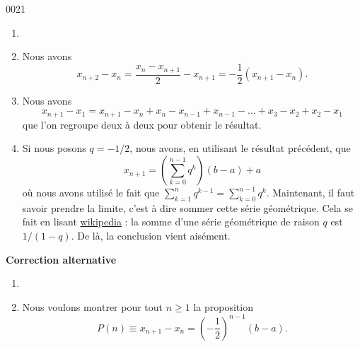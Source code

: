 
\begin{corrige}{0021}

\begin{enumerate}
\item {}
\item Nous avons
\begin{equation}
	x_{n+2}-x_n=\frac{ x_n-x_{n+1} }{ 2 }-x_{n+1}=-\frac{1}{ 2 }(x_{n+1}-x_n).
\end{equation}

\item 
Nous avons
\begin{equation}
	x_{n+1}-x_1=x_{n+1}-x_n+x_n-x_{n-1}+x_{n-1}-\ldots +x_3-x_2+x_2-x_1
\end{equation}
que l'on regroupe deux à deux pour obtenir le résultat.

\item
Si nous posons $q=-1/2$, nous avons, en utilisant le résultat précédent, que
\begin{equation}
	x_{n+1}=\left( \sum_{k=0}^{n-1}q^k \right)(b-a)+a
\end{equation}
où nous avons utilisé le fait que $\sum_{k=1}^nq^{k-1}=\sum_{k=0}^{n-1}q^k$. Maintenant, il faut savoir prendre la limite, c'est à dire sommer cette série géométrique. Cela se fait en lisant \href{http://fr.wikipedia.org/wiki/Série_géométrique}{wikipedia} : la somme d'une série géométrique de raison $q$ est $1/(1-q)$. De là, la conclusion vient aisément.

\end{enumerate}

{\bf Correction alternative}

\begin{enumerate}
\item {}

\item
 Nous voulons montrer pour tout $n \geq 1$ la proposition
  \begin{equation*}
    P(n) \equiv x_{n+1} - x_n = {\left(-\frac12\right)}^{n-1} (b-a).
  \end{equation*}


\end{enumerate}
\end{corrige}
